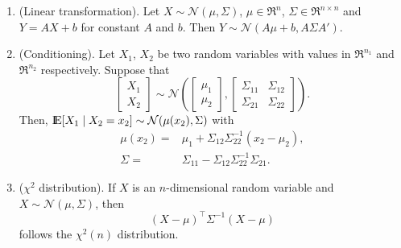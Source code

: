 \documentclass[a4paper,10pt]{scrbook}
\begin{document}
\begin{enumerate}
 
 \item (Linear transformation). Let $X\sim \mathcal{N}(\mu,\Sigma)$, $\mu\in\Re^n$, $\Sigma\in\Re^{n\times n}$ 
       and $Y=AX+b$ for constant $A$ and $b$. Then $Y\sim \mathcal{N}(A\mu+b, A\Sigma A')$.
       
 \item (Conditioning). Let $X_1$, $X_2$ be two random variables with values in $\Re^{n_1}$ and $\Re^{n_2}$
       respectively. Suppose that
\begin{equation*}
        \begin{bmatrix}
         X_1\\X_2
        \end{bmatrix}
{}\sim{}
	\mathcal{N}\left(
	\begin{bmatrix}
         \mu_1\\\mu_2
        \end{bmatrix},
        \begin{bmatrix}
         \Sigma_{11} & \Sigma_{12}\\
         \Sigma_{21} & \Sigma_{22}
        \end{bmatrix}
        \right).
\end{equation*}
Then, \(\E[X_1\mid X_2=x_2] \sim \mathcal{N}(\mu(x_2), \Sigma)\) with 
\begin{align*}
	\mu(x_2) 
{}={}& 
	\mu_1 
{}+{}
	\Sigma_{12}\Sigma_{22}^{-1}(x_2{}-{}\mu_2),
\\
	\Sigma 
{}={}&
	\Sigma_{11}
{}-{}
	\Sigma_{12}\Sigma_{22}^{-1}\Sigma_{21}.
\end{align*}

\item (\(\chi^2\) distribution). If \(X\) is an \(n\)-dimensional random variable and 
      \(X\sim \mathcal{N}(\mu, \Sigma)\), then 
      \[
       (X-\mu)^{\top}\Sigma^{-1}(X-\mu)
      \] 
      follows the \(\chi^2(n)\) distribution.
\end{enumerate}
\end{document}
